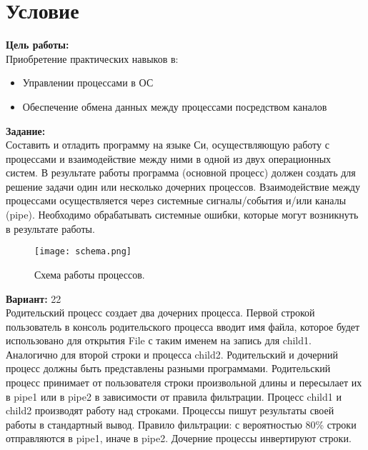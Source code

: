 \section{Условие}

{\bfseries Цель работы:} \\
Приобретение практических навыков в:
\begin{itemize}
\item Управлении процессами в ОС
\item Обеспечение обмена данных между процессами посредством каналов
\end{itemize}

{\bfseries Задание:} \\
Составить и отладить программу на языке Си, осуществляющую работу с процессами и
взаимодействие между ними в одной из двух операционных систем. В результате работы
программа (основной процесс) должен создать для решение задачи один или несколько
дочерних процессов. Взаимодействие между процессами осуществляется через системные
сигналы/события и/или каналы (pipe).
Необходимо обрабатывать системные ошибки, которые могут возникнуть в результате работы.

\begin{figure}[H]
    \centering
    \texttt{[image: schema.png]}
    \caption{Схема работы процессов.}
    \label{fig:schema}
\end{figure}

{\bfseries Вариант:} 22 \\
Родительский процесс создает два дочерних процесса. Первой строкой пользователь в консоль
родительского процесса вводит имя файла, которое будет использовано для открытия File с таким
именем на запись для child1. Аналогично для второй строки и процесса child2. Родительский и
дочерний процесс должны быть представлены разными программами.
Родительский процесс принимает от пользователя строки произвольной длины и пересылает их в
pipe1 или в pipe2 в зависимости от правила фильтрации. Процесс child1 и child2 производят работу
над строками. Процессы пишут результаты своей работы в стандартный вывод. 
Правило фильтрации: с вероятностью 80\% строки отправляются в pipe1, иначе в pipe2.
Дочерние процессы инвертируют строки.